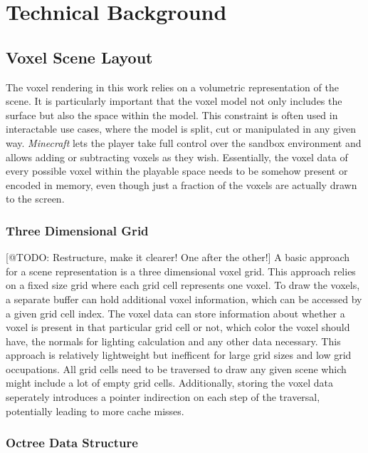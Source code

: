 \chapter{Technical Background} \label{cpt-technical-background}


\section{Voxel Scene Layout} \label{sec-voxel-scene-layout}

The voxel rendering in this work relies on a volumetric representation of the scene.
It is particularly important that the voxel model not only includes the surface but also 
the space within the model. This constraint is often used in interactable use cases, where 
the model is split, cut or manipulated in any given way. \emph{Minecraft} \cite{Mojang2024}
lets the player take full control over the sandbox environment and allows adding or subtracting 
voxels as they wish. Essentially, the voxel data of every possible voxel within the playable 
space needs to be somehow present or encoded in memory, even though just a fraction of the 
voxels are actually drawn to the screen.


\subsection*{Three Dimensional Grid} \label{subsec-three-dimensional-grid}

[@TODO: Restructure, make it clearer! One after the other!]
A basic approach for a scene representation is a three dimensional voxel grid. This 
approach relies on a fixed size grid where each grid cell represents one voxel.
To draw the voxels, a separate buffer can hold additional voxel information, which 
can be accessed by a given grid cell index. The voxel data can store information about 
whether a voxel is present in that particular grid cell or not, which color the voxel 
should have, the normals for lighting calculation and any other data necessary.
This approach is relatively lightweight but inefficent for large grid sizes and low 
grid occupations. All grid cells need to be traversed to draw any given scene which 
might include a lot of empty grid cells. Additionally, storing the voxel data seperately
introduces a pointer indirection on each step of the traversal, potentially leading to more 
cache misses.


\subsection*{Octree Data Structure} \label{subsec-octree-data-structure}

